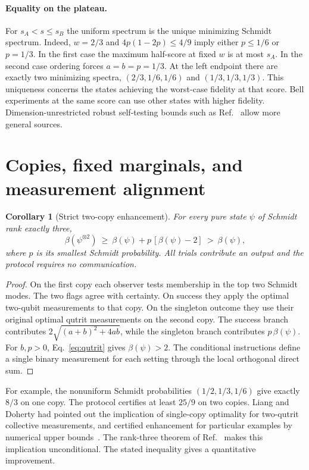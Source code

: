 \documentclass[11pt]{article}
\newtheorem{corollary}[theorem]{Corollary}
\begin{document}
\paragraph{Equality on the plateau.}
For $s_A<s\le s_B$ the uniform spectrum is the unique minimizing Schmidt spectrum. Indeed, $w=2/3$ and $4p(1-2p)\le4/9$ imply either $p\le1/6$ or $p=1/3$. In the first case the maximum half-score at fixed $w$ is at most $s_A$. In the second case ordering forces $a=b=p=1/3$. At the left endpoint there are exactly two minimizing spectra, $(2/3,1/6,1/6)$ and $(1/3,1/3,1/3)$. This uniqueness concerns the states achieving the worst-case fidelity at that score. Bell experiments at the same score can use other states with higher fidelity. Dimension-unrestricted robust self-testing bounds such as Ref.~\cite{kaniewski} allow more general sources.

\section{Copies, fixed marginals, and measurement alignment}
\begin{corollary}[Strict two-copy enhancement]\label{cor:copy}
For every pure state $\psi$ of Schmidt rank exactly three,
\[
  \beta(\psi^{\otimes2})\ \ge\ \beta(\psi)+p\,[\beta(\psi)-2]\ >\ \beta(\psi),
\]
where $p$ is its smallest Schmidt probability. All trials contribute an output and the protocol requires no communication.
\end{corollary}
\begin{proof}
On the first copy each observer tests membership in the top two Schmidt modes. The two flags agree with certainty. On success they apply the optimal two-qubit measurements to that copy. On the singleton outcome they use their original optimal qutrit measurements on the second copy. The success branch contributes $2\sqrt{(a+b)^2+4ab}$, while the singleton branch contributes $p\,\beta(\psi)$. For $b,p>0$, Eq.~\eqref{eq:qutrit} gives $\beta(\psi)>2$. The conditional instructions define a single binary measurement for each setting through the local orthogonal direct sum.
\end{proof}
For example, the nonuniform Schmidt probabilities $(1/2,1/3,1/6)$ give exactly $8/3$ on one copy. The protocol certifies at least $25/9$ on two copies. Liang and Doherty had pointed out the implication of single-copy optimality for two-qutrit collective measurements, and certified enhancement for particular examples by numerical upper bounds~\cite[discussion of Eq.~(8)]{liang}. The rank-three theorem of Ref.~\cite{pollard} makes this implication unconditional. The stated inequality gives a quantitative improvement.
\end{document}
